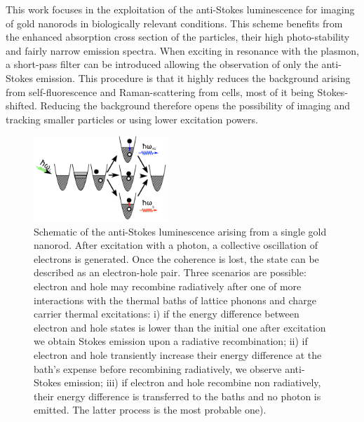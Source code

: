 \documentclass[journal=nalefd,manuscript=letter]{achemso}
\begin{document}
This work focuses in the exploitation of the anti-Stokes
luminescence\cite{Jiang2013} for imaging of gold nanorods in biologically
relevant conditions. This scheme benefits from the enhanced absorption cross
section of the particles, their high photo-stability and fairly narrow emission
spectra. When exciting in resonance with the plasmon, a short-pass filter can be
introduced allowing the observation of only the anti-Stokes emission. This
procedure is that it highly reduces the background arising from
self-fluorescence and Raman-scattering from cells, most of it being
Stokes-shifted. Reducing the background therefore opens the possibility of
imaging and tracking smaller particles or using lower excitation powers.

\begin{figure}[htp] \centering
\includegraphics[width=0.45\textwidth]{Figures/02_Scheme/luminescence_all_AS.png}
\caption{Schematic of the anti-Stokes luminescence arising from a single gold
nanorod. After excitation with a photon, a collective oscillation of electrons
is generated. Once the coherence is lost, the state can be described as an
electron-hole pair. Three scenarios are possible: electron and hole may
recombine radiatively after one of more interactions with the thermal baths of
lattice phonons and charge carrier thermal excitations: i) if the energy
difference between electron and hole states is lower than the initial one after
excitation we obtain Stokes emission upon a radiative recombination; ii) if
electron and hole transiently increase their energy difference at the bath's
expense before recombining radiatively, we observe anti-Stokes emission; iii) if
electron and hole recombine non radiatively, their energy difference is
transferred to the baths and no photon is emitted. The latter process is the
most probable one).}
	\label{fig:anti-Stokes-process}
\end{figure}
\end{document}
